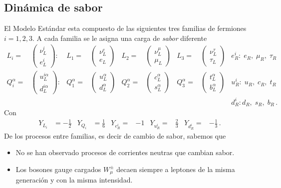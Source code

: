 \subsection{Din\'amica de sabor}
\label{sec:dinamica-de-sabor}
El Modelo Est\'andar esta compuesto de las siguientes tres familias de fermiones $i=1,2,3$. A cada familia se le asigna una carga de \emph{sabor} diferente
\begin{align}
L_i=&
\begin{pmatrix}
  \nu^i_L\\
  e^i_L
\end{pmatrix}:&
  L_1=&
  \begin{pmatrix}
    \nu^e_L\\
    e_L
  \end{pmatrix}&  L_2=&
  \begin{pmatrix}
    \nu^\mu_L\\
    \mu_L
  \end{pmatrix}&  L_3=&
  \begin{pmatrix}
    \nu^\tau_L\\
    \tau_L
  \end{pmatrix}& e_R^i:\;e_R,\;\mu_R,\;\tau_R\nonumber\\
Q_i^\alpha=&
\begin{pmatrix}
  u^{i\alpha}_L\\
  d^{i\alpha}_L
\end{pmatrix}:&
  Q_1^\alpha=&
  \begin{pmatrix}
    u^\alpha_L\\
    d^\alpha_L
  \end{pmatrix}&  Q_2^\alpha=&
  \begin{pmatrix}
    c^\alpha_L\\
    s^\alpha_L
  \end{pmatrix}&  Q_3^\alpha=&
  \begin{pmatrix}
    t^\alpha_L\\
    b^\alpha_L
  \end{pmatrix}& u_R^i:\;u_R,\;c_R,\;t_R\nonumber\\
&&&&&&&&d_R^i:d_R,\;s_R,\;b_R\,.
\end{align}
Con
\begin{align}
  Y_{L_i}&=-\frac{1}{2}&Y_{Q_i}&=\frac{1}{6}& Y_{e_R^i}=&-1&
Y_{u_R^i}=&\frac{2}{3}&Y_{d_R^i}=&-\frac{1}{3}\,.
\end{align}
De los procesos entre familias, es decir de cambio de sabor, sabemos que
\begin{itemize} %
\item No se han observado procesos de corrientes neutras que cambian sabor.
\item Los bosones gauge cargados $W_\mu^\pm$ decaen siempre a leptones de la misma generaci\'on y con la misma intensidad.
\end{itemize} %

